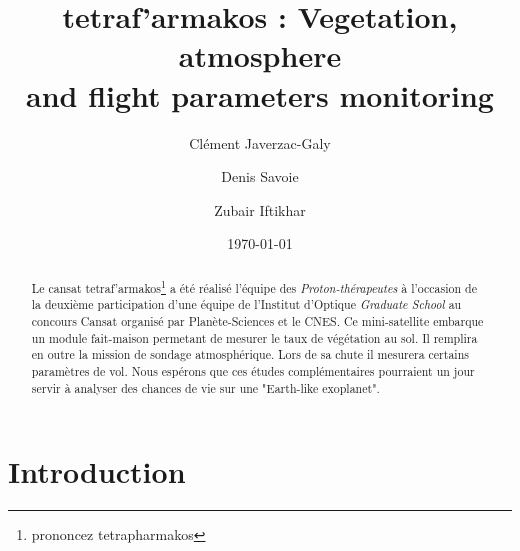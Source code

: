 \documentclass[twocolumn,10pt]{article}
\newcommand\tet{\textgreek{tetraf'armakos}}
\begin{document}
\title{\tet%
: Vegetation, atmosphere\\ and flight parameters monitoring} 
\author{Clément Javerzac-Galy \and{Denis Savoie} \and{Zubair Iftikhar} }
\date{\today}
\maketitle

 
\begin{abstract}
 \begin{bfseries}
	Le cansat \tet \footnote{prononcez tetrapharmakos} a été réalisé l'équipe des \textit{Proton-thérapeutes} à l'occasion de la deuxième participation d'une équipe de l'Institut d'Optique \textit{Graduate School} au concours Cansat organisé par Planète-Sciences et le CNES. Ce mini-satellite embarque un module fait-maison permetant de mesurer le taux de végétation au sol. Il remplira en outre la mission de sondage atmosphérique. Lors de sa chute il mesurera certains paramètres de vol. Nous espérons que ces études complémentaires pourraient un jour servir à analyser des chances de vie sur une "Earth-like exoplanet".
 \end{bfseries}
\end{abstract}

\section{Introduction}
	



\begin{thebibliography}{9}
\end{thebibliography}
\end{document}
